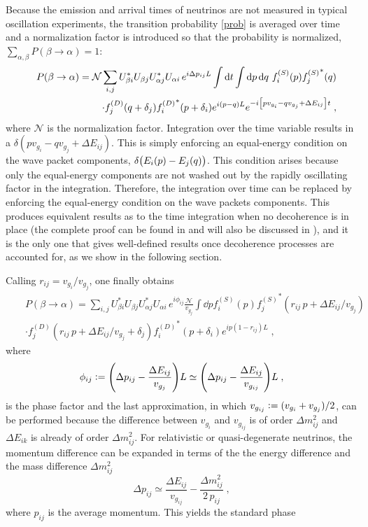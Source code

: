\documentclass[11pt]{article}
\newcommand{\ebd}{\vcentcolon =}
\newcommand{\inttt}[1]{\int\dd{#1}}
\begin{document}
Because the emission and arrival times of neutrinos are not measured in typical oscillation experiments, the transition probability \eqref{prob} is averaged over time \cite{Akhmedov:2009rb} and a normalization factor is introduced so that the probability is normalized, $\sum_{\alpha,\beta} P(\beta\to \alpha) = 1$:
\begin{eqnarray}\label{probbb}
    &&P(\beta\to\alpha) = \mathcal{N}\sum_{i,j} U^*_{\beta i} U_{\beta j} U^*_{\alpha j} U_{\alpha i} \,e^{i\Delta p_{ij}L} \inttt{t}\inttt{p}\dd{q}\,f_i^{(S)}(p){f_j^{(S)}}^*(q) \nonumber \\ &&\cdot f_j^{(D)}(q+\delta_j) {f_i^{(D)}}^*(p+\delta_i) e^{i(p-q)L} e^{-i\qty[pv_{g_i}-qv_{g_j}+\Delta E_{ij}]t}\;,
\end{eqnarray}
where $\mathcal{N}$ is the normalization factor. Integration over the time variable results in a $\delta(pv_{g_i}-qv_{g_j}+\Delta E_{ij})$. This is simply enforcing an equal-energy condition on the wave packet components, $\delta\qty(E_i(p)-E_j(q))$. This condition arises because only the equal-energy components are not washed out by the rapidly oscillating factor in the integration. Therefore, the integration over time can be replaced by enforcing the equal-energy condition on the wave packets components. This produces equivalent results as to the time integration when no decoherence is in place (the complete proof can be found in \cite{Akhmedov:2009rb} and will also be discussed in \cite{PhDVittorio}), and it is the only one that gives well-defined results once decoherence processes are accounted for, as we show in the following section. 

Calling $r_{ij}=v_{g_i}/v_{g_j}$, one finally obtains
\begin{eqnarray}
    &&P(\beta\to\alpha) = \sum_{i,j} U^*_{\beta i} U_{\beta j} U^*_{\alpha j} U_{\alpha i} \,e^{i \phi_{ij}} \frac{\mathcal{N}}{v_{g_j}}\inttt{p} f_i^{(S)}(p) {f_j^{(S)}}^*(r_{ij}\,p+\Delta E_{ij}/v_{g_j}) \nonumber \\ &&\cdot f_j^{(D)}(r_{ij}\,p+\Delta E_{ij}/v_{g_j}+\delta_j) {f_i^{(D)}}^*(p+\delta_i) e^{ip(1-r_{ij})L}\;,\label{oscillation probability standard wave-packet final}
\end{eqnarray}
where
\begin{equation}
    \phi_{ij} \ebd \qty(\Delta p_{ij}-\frac{\Delta E_{ij}}{v_{g_j}})L \simeq  \qty(\Delta p_{ij}-\frac{\Delta E_{ij}}{v_{g_{ij}}})L\;,
\end{equation}
is the phase factor and the last approximation, in which $v_{g_{ij}} \ebd (v_{g_i}+v_{g_j})/2$, can be performed because the difference between $v_{g_i}$ and $v_{g_{ij}}$ is of order $\Delta m^2_{ij}$ and $\Delta E_{ik}$ is already of order $\Delta m^2_{ij}$. For relativistic or quasi-degenerate neutrinos, the momentum difference can be expanded in terms of the the energy difference and the mass difference $\Delta m^2_{ij}$
\begin{equation}
    \Delta p_{ij} \simeq \frac{\Delta E_{ij}}{v_{g_{ij}}} - \frac{\Delta m^2_{ij}}{2\,p_{ij}}\;,
\end{equation}
where $p_{ij}$ is the average momentum. This yields the standard phase
\end{document}
